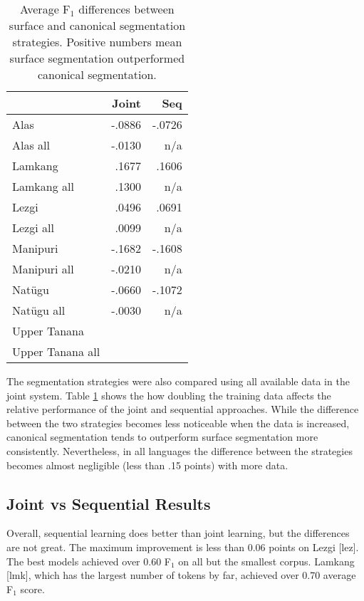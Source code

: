 \begin{table}[!tb]
    \centering
    \begin{tabular}{l|r|r}
          & \textbf{Joint} & \textbf{Seq} \\
         \hline
         Alas  & -.0886 &  -.0726  \\
         Alas all & -.0130 & n/a \\
         \hline
         Lamkang  & .1677 & .1606  \\
         Lamkang all & .1300 & n/a \\
         \hline
         Lezgi  & .0496 & .0691  \\
         Lezgi all & .0099 & n/a \\
         \hline
         Manipuri  & -.1682 & -.1608   \\
         Manipuri all & -.0210 & n/a \\
         \hline
         Natügu  & -.0660 & -.1072  \\
         Natügu all & -.0030 & n/a \\
         \hline
         Upper Tanana &  &  \\
         Upper Tanana all &  &  \\
    \end{tabular}
    \caption[F$_1$-score Differences between Surface and Canonical Segmentation]{Average F$_1$ differences between surface and canonical segmentation strategies. Positive numbers mean surface segmentation outperformed canonical segmentation.}
    \label{tab:segdiffresults}
\end{table}


The segmentation strategies were also compared using all available data in the joint system. Table \ref{tab:segdiffresults} shows the how doubling the training data affects the relative performance of the joint and sequential approaches. 
While the difference between the two strategies becomes less noticeable when the data is increased, canonical segmentation tends to outperform surface segmentation more consistently. Nevertheless, in all languages the difference between the strategies becomes almost negligible (less than .15 points) with more data. 

\subsection{Joint vs Sequential Results}

Overall, sequential learning does better than joint learning, but the differences are not great. The maximum improvement is less than 0.06 points on Lezgi [lez]. The best models achieved over 0.60 F$_1$ on all but the smallest corpus. Lamkang [lmk], which has the largest number of tokens by far, achieved over 0.70 average F$_1$ score. 

